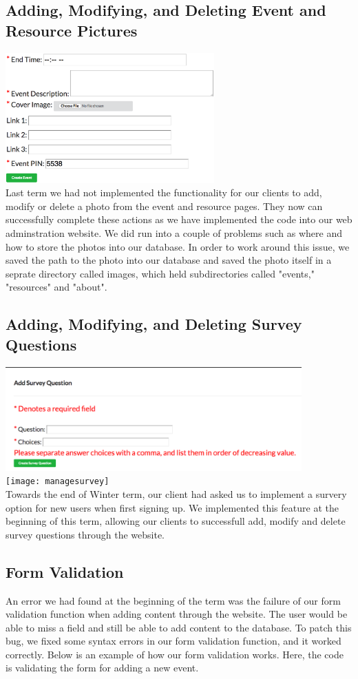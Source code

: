 \documentclass[onecolumn, draftclsnofoot,10pt, compsoc]{IEEEtran}
\begin{document}
  \subsection{Adding, Modifying, and Deleting Event and Resource Pictures}
    \includegraphics[height=5cm]{addcoverimage} \\
    Last term we had not implemented the functionality for our clients to add, modify or delete a photo from the event and resource pages. They now can successfully complete these actions as we have implemented the code into our web adminstration website. We did run into a couple of problems such as where and how to store the photos into our database. In order to work around this issue, we saved the path to the photo into our database and saved the photo itself in a seprate directory called images, which held subdirectories called "events," "resources" and "about".

  \subsection{Adding, Modifying, and Deleting Survey Questions}
    \includegraphics[height=4cm]{addsurveyquestion} \\
    \texttt{[image: managesurvey]} \\
    Towards the end of Winter term, our client had asked us to implement a survery option for new users when first signing up. We implemented this feature at the beginning of this term, allowing our clients to successfull add, modify and delete survey questions through the website.

  \subsection{Form Validation}
    An error we had found at the beginning of the term was the failure of our form validation function when adding content through the website. The user would be able to miss a field and still be able to add content to the database. To patch this bug, we fixed some syntax errors in our form validation function, and it worked correctly. Below is an example of how our form validation works. Here, the code is validating the form for adding a new event.
\end{document}
